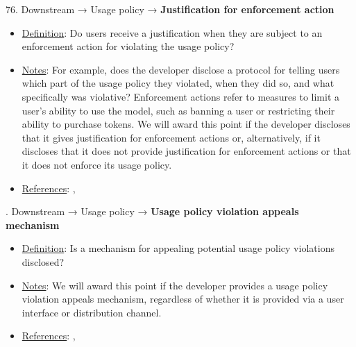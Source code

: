 76. Downstream → Usage policy → \textbf{Justification for enforcement action}
\vspace{-\parskip}
\begin{itemize}
\item
\underline{Definition}: Do users receive a justification when they are subject to an enforcement action for violating the usage policy?
\item
\underline{Notes}: For example, does the developer disclose a protocol for telling users which part of the usage policy they violated, when they did so, and what specifically was violative? Enforcement actions refer to measures to limit a user’s ability to use the model, such as banning a user or restricting their ability to purchase tokens. We will award this point if the developer discloses that it gives justification for enforcement actions or, alternatively, if it discloses that it does not provide justification for enforcement actions or that it does not enforce its usage policy.
\item
\underline{References}: \citet{cohere2022}, \citet{meta2023}
\end{itemize} \vspace{\baselineskip}


. Downstream → Usage policy → \textbf{Usage policy violation appeals mechanism}
\vspace{-\parskip}
\begin{itemize}
\item
\underline{Definition}: Is a mechanism for appealing potential usage policy violations disclosed?
\item
\underline{Notes}: We will award this point if the developer provides a usage policy violation appeals mechanism, regardless of whether it is provided via a user interface or distribution channel.
\item
\underline{References}: \citet{cohere2022}, \citet{meta2023}
\end{itemize} \vspace{\baselineskip}


